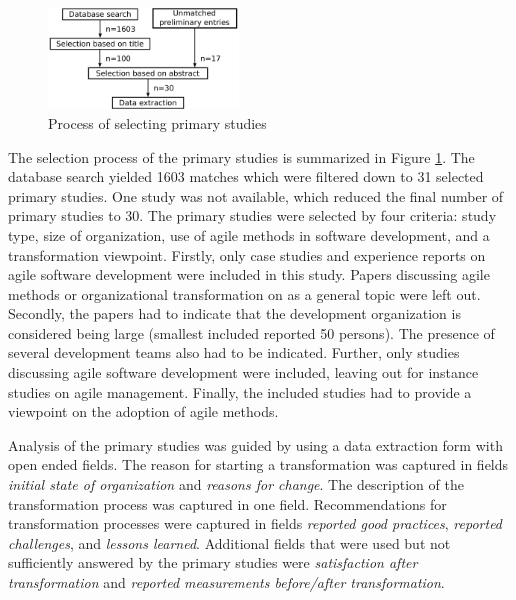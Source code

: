 \documentclass[lnbip]{svmultln}
\begin{document}
\begin{figure}[b]
  \begin{center}
    \includegraphics[width=0.45\textwidth]{researchprocess}
    \caption{Process of selecting primary studies}
    \label{fig:selection_process}
  \end{center}
\end{figure}

The selection process of the primary studies is summarized in Figure
\ref{fig:selection_process}. The database search yielded 1603 matches which were
filtered down to 31 selected primary studies. One study was not available, which
reduced the final number of primary studies to 30.
The primary studies were selected by four criteria: study type, size of
organization, use of agile methods in software development, and a transformation
viewpoint. Firstly, only case studies and experience reports on agile software
development were included in this study. Papers discussing agile methods or
organizational transformation on as a general topic were left out. Secondly, the
papers had to indicate that the development organization is considered being
large (smallest included reported 50 persons). The presence of several
development teams also had to be indicated. Further, only studies discussing
agile software development were included, leaving out for instance studies on
agile management. Finally, the included studies had to provide a viewpoint on
the adoption of agile methods.

Analysis of the primary studies was guided by using a data extraction form with
open ended fields. The reason for starting a transformation was captured in
fields \textit{initial state of organization} and \textit{reasons for change}.
The description of the transformation process was captured in one field.
Recommendations for transformation processes were captured in fields
\textit{reported good practices}, \textit{reported challenges}, and
\textit{lessons learned}.
Additional fields that were used but not sufficiently answered by the primary
studies were \textit{satisfaction after transformation} and \textit{reported
measurements before/after transformation}.


\end{document}
